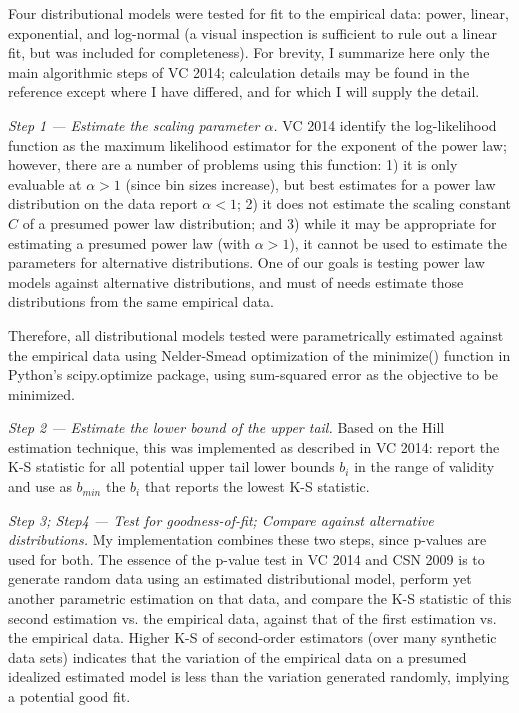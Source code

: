 \documentclass[pdftex,12pt]{llncs}
\begin{document}
Four distributional models were tested for fit to the empirical data:  power, linear, exponential, and log-normal (a visual inspection is sufficient to rule out a linear fit, but was included for completeness).
For brevity, I summarize here only the main algorithmic steps of VC 2014; calculation details may be found in the reference except where I have differed, and for which I will supply the detail.

\textit{Step 1 --- Estimate the scaling parameter $\alpha$.}
VC 2014 identify the log-likelihood function as the maximum likelihood estimator for the exponent of the power law; however, there are a number of problems using this function: 1) it is only evaluable at $\alpha > 1$ (since bin sizes increase), but best estimates for a power law distribution on the data report $\alpha < 1$; 2) it does not estimate the scaling constant $C$ of a presumed power law distribution; and 3) while it may be appropriate for estimating a presumed power law (with $\alpha > 1$), it cannot be used to estimate the parameters for alternative distributions.
One of our goals is testing power law models against alternative distributions, and must of needs estimate those distributions from the same empirical data.  

Therefore, all distributional models tested were parametrically estimated against the empirical data using Nelder-Smead optimization of the minimize() function in Python’s scipy.optimize package, using sum-squared error as the objective to be minimized.

\textit{Step 2 --- Estimate the lower bound of the upper tail.}
Based on the Hill estimation technique, this was implemented as described in VC 2014: report the K-S statistic for all potential upper tail lower bounds $b_i$ in the range of validity and use as $b_{min}$ the $b_i$ that reports the lowest K-S statistic.

\textit{Step 3; Step4 --- Test for goodness-of-fit; Compare against alternative distributions.}
My implementation combines these two steps, since p-values are used for both.
The essence of the p-value test in VC 2014 and CSN 2009 is to generate random data using an estimated distributional model, perform yet another parametric estimation on that data, and compare the K-S statistic of this second estimation vs. the empirical data, against that of the first estimation vs. the empirical data.
Higher K-S of second-order estimators (over many synthetic data sets) indicates that the variation of the empirical data on a presumed idealized estimated model is less than the variation generated randomly, implying a potential good fit.
  
\end{document}
